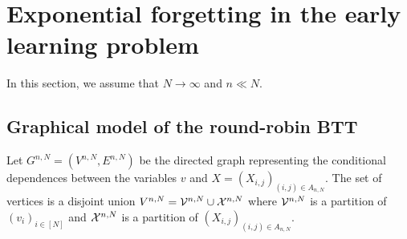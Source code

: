 
\section{Exponential forgetting in the early learning problem}

In this section, we assume that $N\to\infty$ and $n\ll N$.

\subsection{Graphical model of the round-robin BTT}
Let $G^{n,N}=(V^{n,N},E^{n,N})$ be the directed graph representing the conditional dependences between the variables $v$ and $X=(X_{i,j})_{(i,j)\in A_{n,N}}$. The set of vertices is a disjoint union $V^{n,N}=\mathcal{V}^{n,N}\cup \mathcal{X}^{n,N}$ where $\mathcal{V}^{n,N}$ is a partition of $(v_i)_{i\in[N]}$ and $\mathcal{X}^{n,N}$ is a partition of $(X_{i,j})_{(i,j)\in A_{n,N}}$. 

